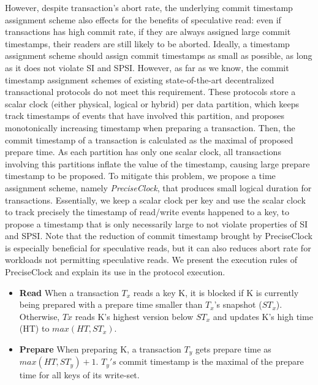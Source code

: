 However, despite transaction's abort rate, the underlying commit timestamp assignment scheme also effects for the benefits of speculative read: even if transactions has high commit rate, if they are always assigned large commit timestamps, their readers are still likely to be aborted. Ideally, a timestamp assignment scheme should assign commit timestamps as small as possible, as long as it does not violate SI and SPSI. However, as far as we know, the commit timestamp assignment schemes of existing state-of-the-art decentralized transactional protocols \cite{clocksi, spanner} do not meet this requirement. These protocols store a scalar clock (either physical, logical or hybrid) per data partition, which keeps track timestamps of events that have involved this partition, and proposes monotonically increasing timestamp when preparing a transaction. Then, the commit timestamp of a transaction is calculated as the maximal of proposed prepare time. As each partition has only one scalar clock, all transactions involving this partitions inflate the value of the timestamp, causing large prepare timestamp to be proposed. To mitigate this problem, we propose a time assignment scheme, namely \textit{PreciseClock}, that produces small logical duration for transactions. Essentially, we keep a scalar clock per key and use the scalar clock to track precisely the timestamp of read/write events happened to a key, to propose a timestamp that is only necessarily large to not violate properties of SI and SPSI. Note that the reduction of commit timestamp brought by PreciseClock is especially beneficial for speculative reads, but it can also reduces abort rate for workloads not permitting speculative reads. We present the execution rules of PreciseClock and explain its use in the protocol execution.
\begin{itemize}
\item \textbf{Read} When a transaction $T_x$ reads a key K, it is blocked if K is currently being prepared with a prepare time smaller than $T_x$'s snapshot ($ST_x$). Otherwise, $Tx$ reads K's highest version below $ST_x$ and updates K's high time (HT) to $max(HT, ST_x)$.
\item \textbf{Prepare} When preparing K, a transaction $T_y$ gets prepare time as $max(HT, ST_y)+1$. $T_y's$ commit timestamp is the maximal of the prepare time for all keys of its write-set.
\end{itemize}

